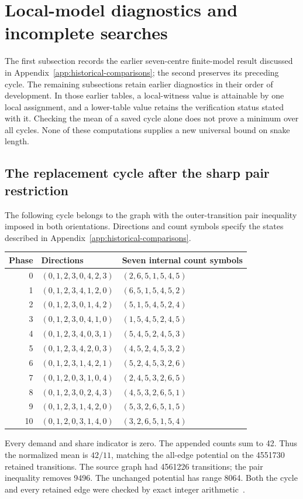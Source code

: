 \documentclass[11pt,a4paper]{article}
\theoremstyle{definition}
\theoremstyle{remark}
\begin{document}
\section{Local-model diagnostics and incomplete searches}\label{app:diagnostics}
The first subsection records the earlier seven-centre finite-model result discussed in Appendix~\ref{app:historical-comparisons}; the second preserves its preceding cycle. The remaining subsections retain earlier diagnostics in their order of development. In those earlier tables, a local-witness value is attainable by one local assignment, and a lower-table value retains the verification status stated with it. Checking the mean of a saved cycle alone does not prove a minimum over all cycles. None of these computations supplies a new universal bound on snake length.

\subsection{The replacement cycle after the sharp pair restriction}\label{app:replacement-cycle}
The following cycle belongs to the graph with the outer-transition pair inequality imposed in both orientations. Directions and count symbols specify the states described in Appendix~\ref{app:historical-comparisons}.
\begin{center}
\begin{tabular}{rll}
\toprule
Phase & Directions & Seven internal count symbols\\\midrule
0 & $(0,1,2,3,0,4,2,3)$ & $(2,6,5,1,5,4,5)$\\
1 & $(0,1,2,3,4,1,2,0)$ & $(6,5,1,5,4,5,2)$\\
2 & $(0,1,2,3,0,1,4,2)$ & $(5,1,5,4,5,2,4)$\\
3 & $(0,1,2,3,0,4,1,0)$ & $(1,5,4,5,2,4,5)$\\
4 & $(0,1,2,3,4,0,3,1)$ & $(5,4,5,2,4,5,3)$\\
5 & $(0,1,2,3,4,2,0,3)$ & $(4,5,2,4,5,3,2)$\\
6 & $(0,1,2,3,1,4,2,1)$ & $(5,2,4,5,3,2,6)$\\
7 & $(0,1,2,0,3,1,0,4)$ & $(2,4,5,3,2,6,5)$\\
8 & $(0,1,2,3,0,2,4,3)$ & $(4,5,3,2,6,5,1)$\\
9 & $(0,1,2,3,1,4,2,0)$ & $(5,3,2,6,5,1,5)$\\
10 & $(0,1,2,0,3,1,4,0)$ & $(3,2,6,5,1,5,4)$\\
\bottomrule
\end{tabular}
\end{center}
Every demand and share indicator is zero. The appended counts sum to 42. Thus the normalized mean is $42/11$, matching the all-edge potential on the 4551730 retained transitions. The source graph had 4561226 transitions; the pair inequality removes 9496. The unchanged potential has range 8064. Both the cycle and every retained edge were checked by exact integer arithmetic~\cite{outerpairarchive}.
\end{document}

